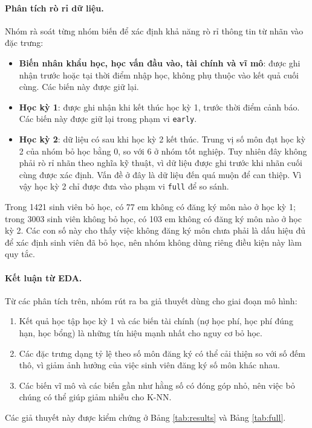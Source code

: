 \documentclass[12pt,a4paper]{article}
\begin{document}
\paragraph{Phân tích rò rỉ dữ liệu.} Nhóm rà soát từng nhóm biến để xác định khả năng rò rỉ thông tin từ nhãn vào đặc trưng:
\begin{itemize}[leftmargin=2em]
\item \textbf{Biến nhân khẩu học, học vấn đầu vào, tài chính và vĩ mô}: được ghi nhận trước hoặc tại thời điểm nhập học, không phụ thuộc vào kết quả cuối cùng. Các biến này được giữ lại.
\item \textbf{Học kỳ 1}: được ghi nhận khi kết thúc học kỳ 1, trước thời điểm cảnh báo. Các biến này được giữ lại trong phạm vi \texttt{early}.
\item \textbf{Học kỳ 2}: dữ liệu có sau khi học kỳ 2 kết thúc. Trung vị số môn đạt học kỳ 2 của nhóm bỏ học bằng 0, so với 6 ở nhóm tốt nghiệp. Tuy nhiên đây không phải rò rỉ nhãn theo nghĩa kỹ thuật, vì dữ liệu được ghi trước khi nhãn cuối cùng được xác định. Vấn đề ở đây là dữ liệu đến quá muộn để can thiệp. Vì vậy học kỳ 2 chỉ được đưa vào phạm vi \texttt{full} để so sánh.
\end{itemize}
Trong 1421 sinh viên bỏ học, có 77 em không có đăng ký môn nào ở học kỳ 1; trong 3003 sinh viên không bỏ học, có 103 em không có đăng ký môn nào ở học kỳ 2. Các con số này cho thấy việc không đăng ký môn chưa phải là dấu hiệu đủ để xác định sinh viên đã bỏ học, nên nhóm không dùng riêng điều kiện này làm quy tắc.

\paragraph{Kết luận từ EDA.} Từ các phân tích trên, nhóm rút ra ba giả thuyết dùng cho giai đoạn mô hình:
\begin{enumerate}[leftmargin=2em]
\item Kết quả học tập học kỳ 1 và các biến tài chính (nợ học phí, học phí đúng hạn, học bổng) là những tín hiệu mạnh nhất cho nguy cơ bỏ học.
\item Các đặc trưng dạng tỷ lệ theo số môn đăng ký có thể cải thiện so với số đếm thô, vì giảm ảnh hưởng của việc sinh viên đăng ký số môn khác nhau.
\item Các biến vĩ mô và các biến gần như hằng số có đóng góp nhỏ, nên việc bỏ chúng có thể giúp giảm nhiễu cho K-NN.
\end{enumerate}
Các giả thuyết này được kiểm chứng ở Bảng \ref{tab:results} và Bảng \ref{tab:full}.
\end{document}
